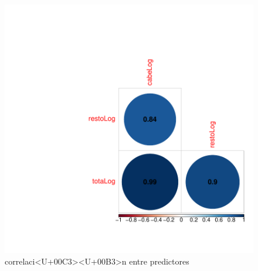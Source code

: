 \begin{figure}[h]
\centering
\begin{adjustbox}{width=7cm,height=7cm,clip,trim=1.5cm 0.5cm 0cm 1.5cm}
\includegraphics{ejemplo-corrPlotX}
\end{adjustbox}
\caption{correlaci<U+00C3><U+00B3>n entre predictores}
\label{corrPlotX}
\end{figure}
\clearpage
